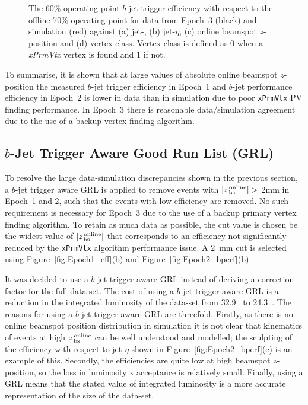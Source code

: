\begin{figure}[!htb]
\vspace{-1em}
\caption[  The $b$-jet trigger efficiency for data from Epoch~3 and simulation.]
        {
          The 60\% operating point $b$-jet trigger efficiency with respect to the offline 70\% operating point
          for data from Epoch~3 (black) and simulation (red) against (a) jet-\pT, (b) jet-$\eta$,
          (c) online beamspot $z$-position and (d) vertex class.
          Vertex class is defined as 0 when a \textit{xPrmVtx} vertex is found and 1 if not.}
\label{fig:Epoch3_eff}
\end{figure}

To summarise, it is shown that at large values of absolute online beamspot $z$-position
the measured $b$-jet trigger efficiency in Epoch~1 and $b$-jet performance efficiency in Epoch~2 is lower in data than in simulation
due to poor \verb|xPrmVtx| PV finding performance.
In Epoch~3 there is reasonable data/simulation agreement due to the use of a backup vertex finding algorithm. 

\newpage
\subsection{$b$-Jet Trigger Aware Good Run List (GRL)}
\label{sec:trig-grl}

To resolve the large data-simulation discrepancies shown in the previous section,
a $b$-jet trigger aware GRL is applied to remove events with $|z_{\,\text{bs}}^{\text{\,online}}| >$ 2mm in Epoch~1 and 2,
such that the events with low efficiency are removed. No such requirement is necessary for Epoch~3 due to the use of a backup primary vertex finding algorithm.
To retain as much data as possible, the cut value is chosen be the widest value of $|z_{\,\text{bs}}^{\text{\,online}}|$
that corresponds to an efficiency not significantly reduced by the \verb|xPrmVtx| algorithm performance issue.
A \SI{2}{\mm} cut is selected using Figure~\ref{fig:Epoch1_eff}(b) and Figure~\ref{fig:Epoch2_bperf}(b).

It was decided to use a $b$-jet trigger aware GRL instead of deriving a correction factor for the full data-set.
The cost of using a $b$-jet trigger aware GRL is a reduction in the integrated luminosity of the data-set from  32.9~\ifb{} to 24.3~\ifb.
The reasons for using a $b$-jet trigger aware GRL are threefold.
Firstly, as there is no online beamspot position distribution in simulation it is not clear that kinematics of events at high  $z_{\,\text{bs}}^{\text{\,online}}$ can be well understood and modelled;
the sculpting of the efficiency with respect to jet-$\eta$ shown in Figure~\ref{fig:Epoch2_bperf}(c) is an example of this.
Secondly, the efficiencies are quite low at high beamspot $z$-position,
so the loss in luminosity x acceptance is relatively small.
Finally, using a GRL means that the stated value of integrated luminosity is a more accurate representation of the size of the data-set.

